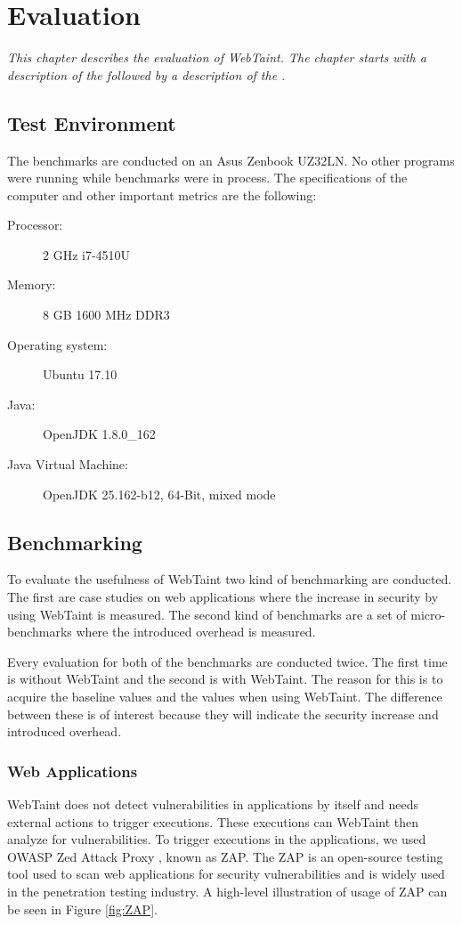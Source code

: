 \chapter{Evaluation}
\label{Evaluation}
\textit{This chapter describes the evaluation of WebTaint. The chapter starts with a description of the \textit{} followed by a description of the \textit{}.}



\section{Test Environment}
\label{TestEnvironment}
The benchmarks are conducted on an Asus Zenbook UZ32LN. No other programs were running while benchmarks were in process. The specifications of the computer and other important metrics are the following:

\begin{description}
    \item [Processor:] 2 GHz i7-4510U
    \item [Memory:] 8 GB 1600 MHz DDR3
    \item [Operating system:] Ubuntu 17.10
    \item [Java:] OpenJDK 1.8.0\_162
    \item [Java Virtual Machine:] OpenJDK 25.162-b12, 64-Bit, mixed mode
\end{description}



\section{Benchmarking}
\label{Benchmarking}
To evaluate the usefulness of WebTaint two kind of benchmarking are conducted. The first are case studies on web applications where the increase in security by using WebTaint is measured. The second kind of benchmarks are a set of micro-benchmarks where the introduced overhead is measured.

Every evaluation for both of the benchmarks are conducted twice. The first time is without WebTaint and the second is with WebTaint. The reason for this is to acquire the baseline values and the values when using WebTaint. The difference between these is of interest because they will indicate the security increase and introduced overhead.



\subsection{Web Applications}
WebTaint does not detect vulnerabilities in applications by itself and needs external actions to trigger executions. These executions can WebTaint then analyze for vulnerabilities. To trigger executions in the applications, we used OWASP Zed Attack Proxy \parencite{zap}, known as ZAP. The ZAP is an open-source testing tool used to scan web applications for security vulnerabilities and is widely used in the penetration testing industry. A high-level illustration of usage of ZAP can be seen in Figure \ref{fig:ZAP}. 

